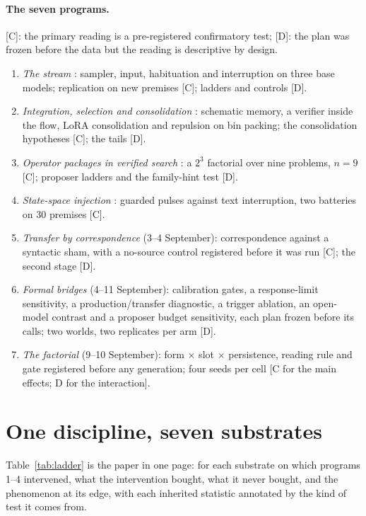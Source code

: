 \documentclass[11pt]{article}
\begin{document}
\paragraph{The seven programs.} [C]: the primary reading is a
pre-registered confirmatory test; [D]: the plan was frozen before the data
but the reading is descriptive by design.
\begin{enumerate}
\item \emph{The stream} \citep{ono2026interrupting}: sampler, input,
habituation and interruption on three base models; replication on new
premises [C]; ladders and controls [D].
\item \emph{Integration, selection and consolidation} \citep{ono2026mass}:
schematic memory, a verifier inside the flow, LoRA consolidation and
repulsion on bin packing; the consolidation hypotheses [C]; the tails [D].
\item \emph{Operator packages in verified search} \citep{ono2026operator}:
a $2^3$ factorial over nine problems, $n=9$ [C]; proposer ladders and the
family-hint test [D].
\item \emph{State-space injection} \citep{ono2026pulsed}: guarded pulses
against text interruption, two batteries on 30 premises [C].
\item \emph{Transfer by correspondence} (3--4 September): correspondence
against a syntactic sham, with a no-source control registered before it
was run [C]; the second stage [D].
\item \emph{Formal bridges} (4--11 September): calibration gates, a
response-limit sensitivity, a production/transfer diagnostic, a trigger
ablation, an open-model contrast and a proposer budget sensitivity, each
plan frozen before its calls; two worlds, two replicates per arm [D].
\item \emph{The factorial} (9--10 September): form $\times$ slot $\times$
persistence, reading rule and gate registered before any generation; four
seeds per cell [C for the main effects; D for the interaction].
\end{enumerate}

\section{One discipline, seven substrates}
\label{sec:ladder}

Table~\ref{tab:ladder} is the paper in one page: for each substrate on
which programs 1--4 intervened, what the intervention bought, what it never
bought, and the phenomenon at its edge, with each inherited statistic
annotated by the kind of test it comes from.
\end{document}
